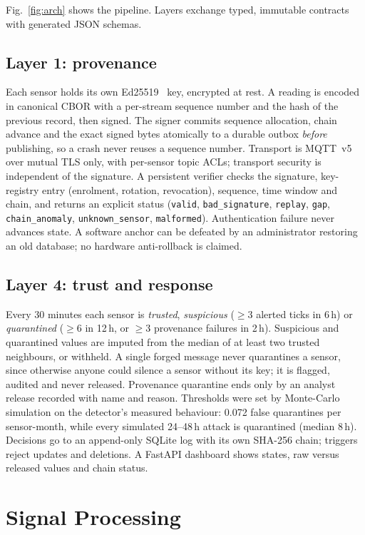 \documentclass[conference]{IEEEtran}
\newcommand{\code}[1]{\texttt{\small #1}}
\begin{document}
Fig.~\ref{fig:arch} shows the pipeline. Layers exchange typed, immutable contracts with generated JSON
schemas.

\subsection{Layer 1: provenance}
Each sensor holds its own Ed25519~\cite{ed25519} key, encrypted at rest. A reading is encoded in canonical CBOR with a
per-stream sequence number and the hash of the previous record, then signed. The signer commits sequence
allocation, chain advance and the exact signed bytes atomically to a durable outbox \emph{before}
publishing, so a crash never reuses a sequence number. Transport is MQTT~v5 over mutual TLS only, with
per-sensor topic ACLs; transport security is independent of the signature. A persistent verifier checks the
signature, key-registry entry (enrolment, rotation, revocation), sequence, time window and chain, and
returns an explicit status (\code{valid}, \code{bad\_signature}, \code{replay}, \code{gap},
\code{chain\_anomaly}, \code{unknown\_sensor}, \code{malformed}). Authentication failure never advances
state. A software anchor can be defeated by an administrator restoring an old database; no hardware
anti-rollback is claimed.

\subsection{Layer 4: trust and response}
Every 30 minutes each sensor is \emph{trusted}, \emph{suspicious} ($\geq 3$ alerted ticks in 6\,h) or
\emph{quarantined} ($\geq 6$ in 12\,h, or $\geq 3$ provenance failures in 2\,h). Suspicious and quarantined
values are imputed from the median of at least two trusted neighbours, or withheld. A single forged message
never quarantines a sensor, since otherwise anyone could silence a sensor without its key; it is flagged,
audited and never released. Provenance quarantine ends only by an analyst release recorded with name and
reason. Thresholds were set by Monte-Carlo simulation on the detector's measured behaviour: 0.072 false
quarantines per sensor-month, while every simulated 24--48\,h attack is quarantined (median 8\,h). Decisions
go to an append-only SQLite log with its own SHA-256 chain; triggers reject updates and deletions. A
FastAPI dashboard shows states, raw versus released values and chain status.

\section{Signal Processing}
\end{document}
